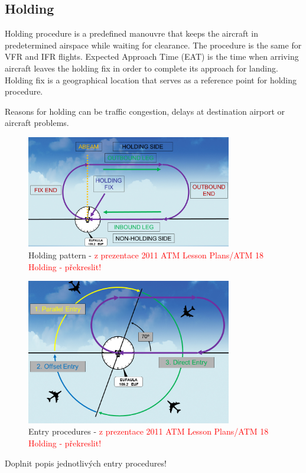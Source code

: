 \subsection{Holding}
Holding procedure is a predefined manouvre that keeps the aircraft in predetermined airspace while waiting for clearance. The procedure is the same for VFR and IFR flights.
Expected Approach Time (EAT) is the time when arriving aircraft leaves the holding fix in order to complete its approach for landing. Holding fix is a geographical location that serves as a reference point for holding procedure.
\cite[Chapter 6.5.8]{doc4444}

Reasons for holding can be traffic congestion, delays at destination airport or aircraft problems.

\begin{figure}[h]
    \centering
    \includegraphics[width=0.8\textwidth]{figures/holding.png}
    \caption{Holding pattern - \textcolor{red}{z prezentace 2011 ATM Lesson Plans/ATM 18 Holding - překreslit!}}
    \label{fig:classes}
\end{figure}
\begin{figure}[h]
    \centering
    \includegraphics[width=0.8\textwidth]{figures/holding-entry.png}
    \caption{Entry procedures - \textcolor{red}{z prezentace 2011 ATM Lesson Plans/ATM 18 Holding - překreslit!}}
    \label{fig:classes}
\end{figure}
Doplnit popis jednotlivých entry procedures!

